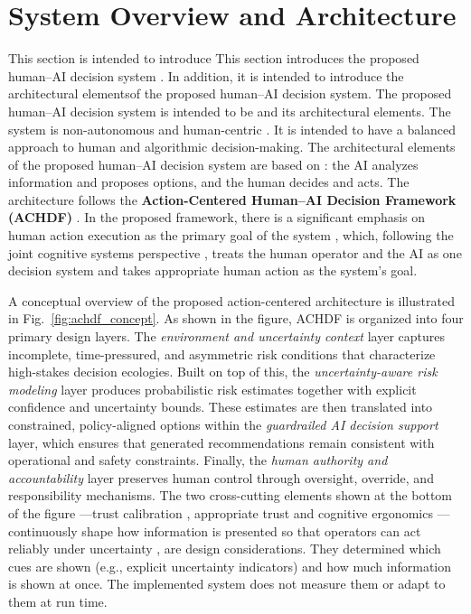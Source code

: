\documentclass[journal]{IEEEtran}
\theoremstyle{plain}
\theoremstyle{definition}
\providecommand{\DIFaddtex}[1]{{\protect\color{blue} \sf #1}} %
\providecommand{\DIFdeltex}[1]{{\protect\color{red} \scriptsize #1}} %
\providecommand{\DIFaddbegin}{} %
\providecommand{\DIFaddend}{} %
\providecommand{\DIFdelbegin}{} %
\providecommand{\DIFdelend}{} %
\providecommand{\DIFadd}[1]{\texorpdfstring{\DIFaddtex{#1}}{#1}} %
\providecommand{\DIFdel}[1]{\texorpdfstring{\DIFdeltex{#1}}{}} %
\newcommand{\DIFscaledelfig}{0.5}
\newlength{\DIFdelgraphicswidth} %
\newlength{\DIFdelgraphicsheight} %
\newcommand{\DIFaddincludegraphics}[2][]{{\color{blue}\fbox{\DIFOincludegraphics[#1]{#2}}}} %
\newcommand{\DIFdelincludegraphics}[2][]{%
\sbox{\DIFdelgraphicsbox}{\DIFOincludegraphics[#1]{#2}}%
\settoboxwidth{\DIFdelgraphicswidth}{\DIFdelgraphicsbox} %
\settoboxtotalheight{\DIFdelgraphicsheight}{\DIFdelgraphicsbox} %
\scalebox{\DIFscaledelfig}{%
\parbox[b]{\DIFdelgraphicswidth}{\usebox{\DIFdelgraphicsbox}\\[-\baselineskip] \rule{\DIFdelgraphicswidth}{0em}}\llap{\resizebox{\DIFdelgraphicswidth}{\DIFdelgraphicsheight}{%
\setlength{\unitlength}{\DIFdelgraphicswidth}%
\begin{picture}(1,1)%
\thicklines\linethickness{2pt} %
{\color[rgb]{1,0,0}\put(0,0){\framebox(1,1){}}}%
{\color[rgb]{1,0,0}\put(0,0){\line( 1,1){1}}}%
{\color[rgb]{1,0,0}\put(0,1){\line(1,-1){1}}}%
\end{picture}%
}\hspace*{3pt}}} %
} %
\DeclareRobustCommand{\DIFaddbegin}{\DIFOaddbegin \let\includegraphics\DIFaddincludegraphics} %
\DeclareRobustCommand{\DIFaddend}{\DIFOaddend \let\includegraphics\DIFOincludegraphics} %
\DeclareRobustCommand{\DIFdelbegin}{\DIFOdelbegin \let\includegraphics\DIFdelincludegraphics} %
\DeclareRobustCommand{\DIFdelend}{\DIFOaddend \let\includegraphics\DIFOincludegraphics} %
\begin{document}
    \section{System Overview and Architecture}
    \DIFdelbegin \DIFdel{This section is intended to introduce }\DIFdelend \DIFaddbegin \label{sec:system}
    \DIFadd{This section introduces }\DIFaddend the proposed human--AI decision system \DIFdelbegin \DIFdel{. In addition, it is intended to introduce the architectural elementsof the proposed human--AI decision system. The proposed human--AI decision system is intended to be }\DIFdelend \DIFaddbegin \DIFadd{and its architectural elements. The system is }\DIFaddend non-autonomous and human-centric\DIFdelbegin \DIFdel{. It is intended to have a balanced approach to human and algorithmic decision-making. The architectural elements of the proposed human--AI decision system are based on }\DIFdelend \DIFaddbegin \DIFadd{: the AI analyzes information and proposes options, and the human decides and acts. The architecture follows }\DIFaddend the \textbf{Action-Centered Human--AI Decision Framework (ACHDF)}\DIFdelbegin \DIFdel{. In the proposed framework, there is a significant emphasis on human action execution as the primary goal of the system}\DIFdelend \DIFaddbegin \DIFadd{, which, following the joint cognitive systems perspective \cite{Hollnagel2005JCS,Woods2006JCS}, treats the human operator and the AI as one decision system and takes appropriate human action as the system's goal}\DIFaddend .

    A conceptual overview of the proposed action-centered architecture is illustrated in Fig.~\ref{fig:achdf_concept}.
As shown in the figure, ACHDF is organized into four primary design layers. The \emph{environment and uncertainty context} layer captures incomplete, time-pressured, and asymmetric risk conditions that characterize high-stakes decision ecologies. Built on top of this, the \emph{uncertainty-aware risk modeling} layer produces probabilistic risk estimates together with explicit confidence and uncertainty bounds. These estimates are then translated into constrained, policy-aligned options within the \emph{guardrailed AI decision support} layer, which ensures that generated recommendations remain consistent with operational and safety constraints. Finally, the \emph{human authority and accountability} layer preserves human control through oversight, override, and responsibility mechanisms. The two cross-cutting elements \DIFdelbegin \DIFdel{shown }\DIFdelend at the bottom of the figure\DIFdelbegin \DIFdel{—trust calibration }\DIFdelend \DIFaddbegin \DIFadd{, appropriate trust }\DIFaddend and cognitive ergonomics\DIFdelbegin \DIFdel{—continuously shape how information is presented so that operators can act reliably under uncertainty}\DIFdelend \DIFaddbegin \DIFadd{, are design considerations. They determined which cues are shown (e.g., explicit uncertainty indicators) and how much information is shown at once. The implemented system does not measure them or adapt to them at run time}\DIFaddend .
\end{document}
